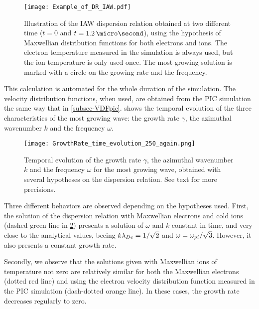   \begin{figure}[hbtp]
    \centering
    \texttt{[image: Example\_of\_DR\_IAW.pdf]}
    \caption{Illustration of the \ac{IAW} dispersion relation obtained at two different time ($t=0$ and $t=1.2\,\micro\second$), using the hypothesis of Maxwellian distribution functions for both electrons and ions. The electron temperature measured in the simulation is always used, but the ion temperature is only used once. The most growing solution is marked with a circle on the growing rate and the frequency.}
    \label{fig-Example_of_DR_IAW}
  \end{figure}
  
  
  This calculation is automated for the whole duration of the simulation.
  The velocity distribution functions, when used, are obtained from the \ac{PIC} simulation the same way that in \cref{subsec-VDFpic}.
   shows the temporal evolution of the three characteristics of the most growing wave: the growth rate $\gamma$, the azimuthal wavenumber $k$ and the frequency $\omega$.
  \begin{figure}[hbtp]
    \centering
    \texttt{[image: GrowthRate\_time\_evolution\_250\_again.png]}  %
    \caption{Temporal evolution of the growth rate $\gamma$, the azimuthal wavenumber $k$ and the frequency $\omega$ for the most growing wave, obtained with several hypotheses on the dispersion relation. See text for more precisions. }
    \label{fig-time_wave}
  \end{figure}
  
  Three different behaviors are observed depending on the hypotheses used.
  First, the solution of the dispersion relation with Maxwellian electrons and cold ions (dashed green line in \cref{fig-time_wave}) presents a solution of $\omega$ and $k$ constant in time, and very close to the analytical values, beeing $k \lambda_{De} = 1/\sqrt{2}$ and $\omega = \omega_{pi}/\sqrt{3}$.
  However, it also presents a constant growth rate.
  
  Secondly, we observe that the solutions given with Maxwellian ions of temperature not zero are relatively similar for both the Maxwellian electrons  (dotted red line) and using the electron velocity distribution function measured in the \ac{PIC} simulation (dash-dotted orange line).
  In these cases, the growth rate decreases regularly to zero.
  
